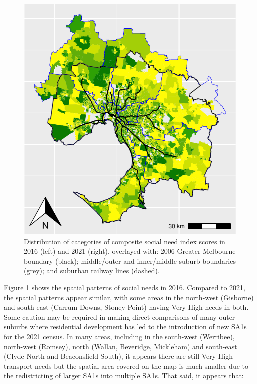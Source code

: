\documentclass[preprint, 3p,
authoryear]{elsarticle} %
\begin{document}
\begin{figure}
\includegraphics[width=0.9\linewidth]{ReynoldsCurrieQu2024_files/figure-latex/Greater_Melbourne_2016_social_needs_appendix-1} \caption{Distribution of categories of composite social need index scores in 2016 (left) and 2021 (right), overlayed with: 2006 Greater Melbourne boundary (black); middle/outer and inner/middle suburb boundaries (grey); and suburban railway lines (dashed).}\label{fig:Greater_Melbourne_2016_social_needs_appendix}
\end{figure}

Figure \ref{fig:Greater_Melbourne_2016_social_needs_appendix} shows the
spatial patterns of social needs in 2016. Compared to 2021, the spatial
patterns appear similar, with some areas in the north-west (Gisborne)
and south-east (Carrum Downs, Stoney Point) having Very High needs in
both. Some caution may be required in making direct comparisons of many
outer suburbs where residential development has led to the introduction
of new SA1s for the 2021 census. In many areas, including in the
south-west (Werribee), north-west (Romsey), north (Wallan, Beveridge,
Mickleham) and south-east (Clyde North and Beaconsfield South), it
appears there are still Very High transport needs but the spatial area
covered on the map is much smaller due to the redistricting of larger
SA1s into multiple SA1s. That said, it appears that:
\end{document}
